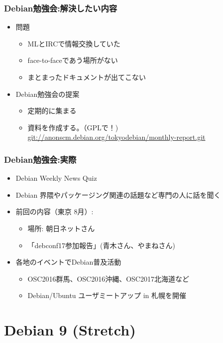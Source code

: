 \begin{frame}

\frametitle{Debian勉強会:解決したい内容}
\begin{itemize}
 \item<1-> 問題
       \begin{itemize}
	\item MLとIRCで情報交換していた
	\item face-to-faceであう場所がない
	\item まとまったドキュメントが出てこない
       \end{itemize}
 \item<2-> Debian勉強会の提案
       \begin{itemize}
	\item 定期的に集まる
	\item 資料を作成する。（GPLで！) \\
	  {\small \url{git://anonscm.debian.org/tokyodebian/monthly-report.git}}
       \end{itemize}
\end{itemize}

\end{frame}

\begin{frame}
 \frametitle{Debian勉強会:実際}
 \begin{itemize}
  \item Debian Weekly News Quiz
  \item Debian 界隈やパッケージング関連の話題など専門の人に話を聞く
  \item 前回の内容（東京 8月）:\\
	\begin{itemize}
	\item 場所: 朝日ネットさん
    \item 「debconf17参加報告」(青木さん、やまねさん)
	\end{itemize}
  \item 各地のイベントでDebian普及活動
	\begin{itemize}
	  \item OSC2016群馬、OSC2016沖縄、OSC2017北海道など
	  \item Debian/Ubuntu ユーザミートアップ in 札幌を開催
	\end{itemize}
 \end{itemize}
\end{frame}


\section{Debian 9 (Stretch)}

